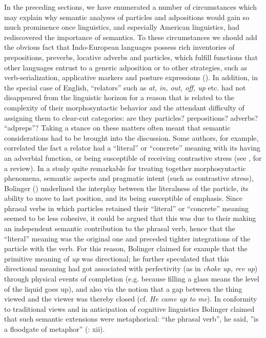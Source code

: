 \documentclass[output=paper]{langscibook}
\begin{document}
In the preceding sections, we have enumerated a number of circumstances which may explain why semantic analyses of particles and adpositions would gain so much prominence once linguistics, and especially American linguistics, had rediscovered the importance of semantics. To these circumstances we should add the obvious fact that Indo-European languages possess rich inventories of prepositions, preverbs, locative adverbs and particles, which fulfill functions that other languages entrust to a generic adposition or to other strategies, such as verb-serialization, applicative markers and posture expressions (\citealt{fortis_morpho-syntax_2016}). In addition, in the special case of English, “relators” such as \textit{at, in, out, off, up} etc. had not disappeared from the linguistic horizon for a reason that is related to the complexity of their morphosyntactic behavior and the attendant difficulty of assigning them to clear-cut categories: are they particles? prepositions? adverbs? “adpreps”? Taking a stance on these matters often meant that semantic considerations had to be brought into the discussion. Some authors, for example, correlated the fact a relator had a “literal” or “concrete” meaning with its having an adverbial function, or being susceptible of receiving contrastive stress (see \citealt{lindner_lexico-semantic_1981}, for a review). In a study quite remarkable for treating together morphosyntactic phenomena, semantic aspects and pragmatic intent (such as contrastive stress), Bolinger (\citeyear{bolinger_phrasal_1971}) underlined the interplay between the literalness of the particle, its ability to move to last position, and its being susceptible of emphasis. Since phrasal verbs in which particles retained their “literal” or “concrete” meaning seemed to be less cohesive, it could be argued that this was due to their making an independent semantic contribution to the phrasal verb, hence that the “literal” meaning was the original one and preceded tighter integrations of the particle with the verb. For this reason, Bolinger claimed for example that the primitive meaning of \textit{up} was directional; he further speculated that this directional meaning had got associated with perfectivity (as in \textit{choke up, rev up}) through physical events of completion (e.g. because filling a glass means the level of the liquid goes up), and also via the notion that a gap between the thing viewed and the viewer was thereby closed (cf. \textit{He came up to me}). In conformity to traditional views and in anticipation of cognitive linguistics Bolinger claimed that such semantic extensions were metaphorical: “the phrasal verb”, he said, ”is a floodgate of metaphor” (\citealt{bolinger_phrasal_1971}: xii).
\end{document}
